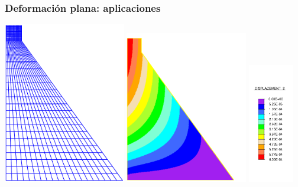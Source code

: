 \documentclass{beamer}
\begin{document}
\begin{frame}
\frametitle{Deformación plana: aplicaciones}
\begin{center}
\includegraphics[width=0.40\textwidth]{dam2dm}
\hfill
\includegraphics[width=0.40\textwidth]{dam2dc1}
\includegraphics[width=0.15\textwidth]{dam2dc2}
\end{center}
\end{frame}
\end{document}
